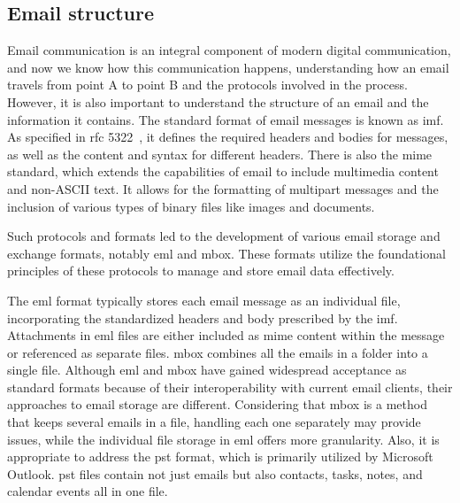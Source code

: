 

\subsection{Email structure}

Email communication is an integral component of modern digital communication, and now we know how this communication happens, understanding how an email travels from point A to point B and the protocols involved in the process. However, it is also important to understand the structure of an email and the information it contains. The standard format of email messages is known as \ac{imf}. As specified in \ac{rfc} 5322~\cite{rfc5322}, it defines the required headers and bodies for messages, as well as the content and syntax for different headers. There is also the \ac{mime} standard, which extends the capabilities of email to include multimedia content and non-ASCII text. It allows for the formatting of multipart messages and the inclusion of various types of binary files like images and documents. 

Such protocols and formats led to the development of various email storage and exchange formats, notably \ac{eml} and \ac{mbox}. These formats utilize the foundational principles of these protocols to manage and store email data effectively.

The \ac{eml} format typically stores each email message as an individual file, incorporating the standardized headers and body prescribed by the \ac{imf}. Attachments in \ac{eml} files are either included as \ac{mime} content within the message or referenced as separate files. \ac{mbox} combines all the emails in a folder into a single file. Although \ac{eml} and \ac{mbox} have gained widespread acceptance as standard formats because of their interoperability with current email clients, their approaches to email storage are different. Considering that \ac{mbox} is a method that keeps several emails in a file, handling each one separately may provide issues, while the individual file storage in \ac{eml} offers more granularity.
Also, it is appropriate to address the \ac{pst} format, which is primarily utilized by Microsoft Outlook. \ac{pst} files contain not just emails but also contacts, tasks, notes, and calendar events all in one file.

